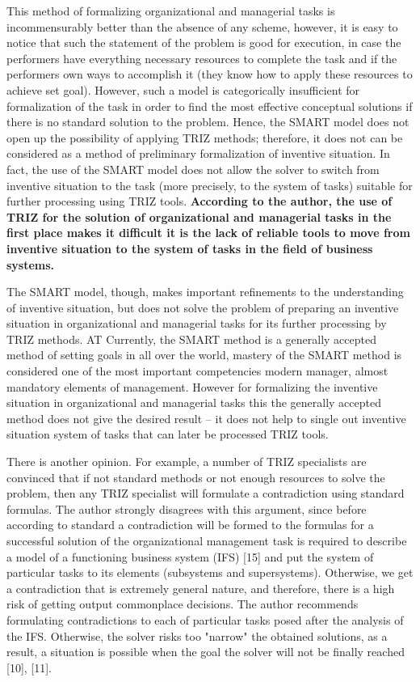 This method of formalizing organizational and managerial tasks is
incommensurably better than the absence of any scheme, however, it is easy to
notice that such the statement of the problem is good for execution, in case
the performers have everything necessary resources to complete the task and if
the performers own ways to accomplish it (they know how to apply these
resources to achieve set goal). However, such a model is categorically
insufficient for formalization of the task in order to find the most effective
conceptual solutions if there is no standard solution to the problem. Hence,
the SMART model does not open up the possibility of applying TRIZ methods;
therefore, it does not can be considered as a method of preliminary
formalization of inventive situation. In fact, the use of the SMART model does
not allow the solver to switch from inventive situation to the task (more
precisely, to the system of tasks) suitable for further processing using TRIZ
tools.  \textbf{According to the author, the use of TRIZ for the solution of
  organizational and managerial tasks in the first place makes it difficult it
  is the lack of reliable tools to move from inventive situation to the system
  of tasks in the field of business systems.}

The SMART model, though, makes important refinements to the understanding of
inventive situation, but does not solve the problem of preparing an inventive
situation in organizational and managerial tasks for its further processing by
TRIZ methods. AT Currently, the SMART method is a generally accepted method of
setting goals in all over the world, mastery of the SMART method is considered
one of the most important competencies modern manager, almost mandatory
elements of management. However for formalizing the inventive situation in
organizational and managerial tasks this the generally accepted method does
not give the desired result -- it does not help to single out inventive
situation system of tasks that can later be processed TRIZ tools.

There is another opinion. For example, a number of TRIZ specialists are
convinced that if not standard methods or not enough resources to solve the
problem, then any TRIZ specialist will formulate a contradiction using
standard formulas.  The author strongly disagrees with this argument, since
before according to standard a contradiction will be formed to the formulas
for a successful solution of the organizational management task is required to
describe a model of a functioning business system (IFS) [15] and put the
system of particular tasks to its elements (subsystems and
supersystems). Otherwise, we get a contradiction that is extremely general
nature, and therefore, there is a high risk of getting output commonplace
decisions. The author recommends formulating contradictions to each of
particular tasks posed after the analysis of the IFS. Otherwise, the solver
risks too "narrow" the obtained solutions, as a result, a situation is
possible when the goal the solver will not be finally reached [10], [11].


